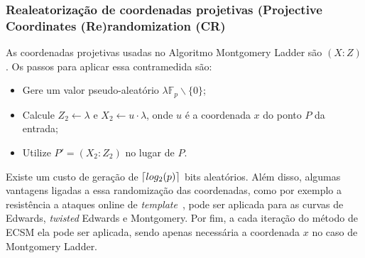 \documentclass{SBCbookchapter}
\DeclarePairedDelimiter\ceil{\lceil}{\rceil}
\newcommand{\rcv}{\leftarrow}
\begin{document}
\subsubsection{Realeatorização de coordenadas projetivas (Projective Coordinates (Re)randomization (CR)~\cite{Coron1999}}
As coordenadas projetivas usadas no Algoritmo Montgomery Ladder são $(X : Z)$. Os passos para aplicar essa contramedida são:
\begin{itemize}
    \item Gere um valor pseudo-aleatório $\lambda \mathbb{F}_p \backslash \{0\}$;
    \item Calcule $Z_2 \rcv \lambda$ e $X_2 \rcv u \cdot \lambda$, onde $u$ é a coordenada $x$ do ponto $P$ da entrada;
    \item Utilize $P'=(X_2:Z_2)$ no lugar de $P$.
\end{itemize}

Existe um custo de geração de $\ceil{log_2(p)}$ {bits} aleatórios. Além disso, algumas vantagens ligadas a essa randomização das coordenadas, como por exemplo a resistência a ataques online de \emph{template}~\cite{BatinaChmielewski2014}, pode ser aplicada para as curvas de Edwards, \textit{twisted} Edwards e Montgomery. Por fim, a cada iteração do método de ECSM ela pode ser aplicada, sendo apenas necessária a coordenada $x$ no caso de Montgomery Ladder.

\end{document}
